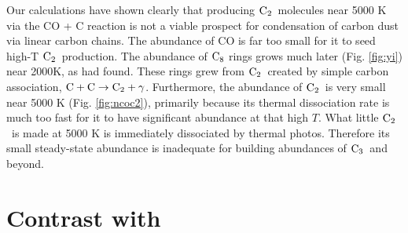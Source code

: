 \documentclass[manuscript]{aastex}
\newcommand{\ctwo}{{\rm C}_2}
\newcommand{\cthree}{{\rm C}_3}
\newcommand{\ceight}{{\rm C}_8}
\newcommand{\twoctoctwo}{${\rm C} + {\rm C} \to \ctwo + \gamma$}
\begin{document}
Our calculations have shown clearly that producing $\ctwo$\ molecules near
5000 K via the CO + C reaction \citep{2009ApJ...703..642C} is not a viable
prospect for condensation of carbon dust via linear carbon chains.
The abundance of CO is far too small for it to seed high-T $\ctwo$\ production.
The abundance of $\ceight$
rings grows much later (Fig. \ref{fig:yi}) near 2000K, as
\citet{1999Sci...283.1290C,2001ApJ...562..480C} had found.
These rings grew from $\ctwo$\ created by simple carbon association,
\twoctoctwo.
Furthermore, the abundance of $\ctwo$\ is very small near 5000 K
(Fig. \ref{fig:ncoc2}),
primarily because its thermal dissociation rate is much too fast for
it to have significant abundance at that high $T$.
What little $\ctwo$\ is made at 5000 K is immediately dissociated by
thermal photos. Therefore its small steady-state abundance is inadequate
for building abundances of $\cthree$\ and beyond. 

\section{Contrast with \citet{2009ApJ...703..642C,2010ApJ...713....1C}}
\end{document}
